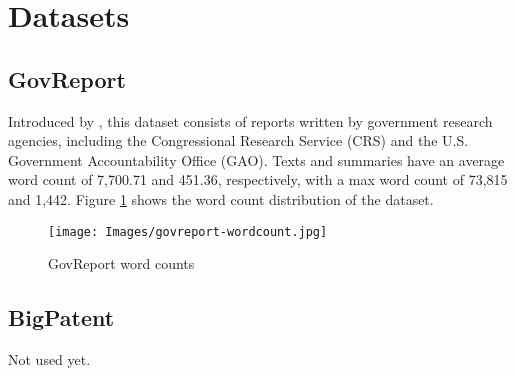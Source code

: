 \section{Datasets}


\subsection*{GovReport}

Introduced by \citet{huang-etal-2021-efficient}, this dataset consists of
reports written by government research agencies, including the Congressional
Research Service (CRS) and the U.S. Government Accountability Office (GAO).
Texts and summaries have an average word count of 7,700.71 and 451.36,
respectively, with a max word count of 73,815 and 1,442.
Figure \ref{fig:govreport} shows the word count distribution of the dataset.

\begin{figure}[!ht]
	\centering
	\texttt{[image: Images/govreport-wordcount.jpg]}
	\caption{GovReport word counts}
	\label{fig:govreport}
\end{figure}


\subsection*{BigPatent}

Not used yet. \nocite{sharma-etal-2019-bigpatent}
